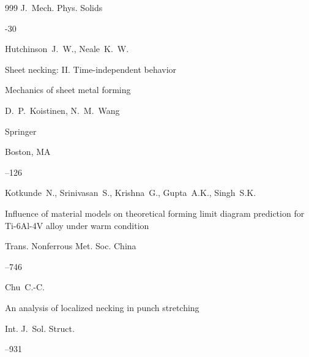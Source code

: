 \begin{thebibliography}{999}
\jour J.~Mech. Phys. Solids




-30





\by Hutchinson~J.~W., Neale~K.~W.

\paper Sheet necking: II. Time-independent behavior

\inbook Mechanics of sheet metal forming 

\eds D.~P.~Koistinen, N.~M.~Wang 

\publ Springer

\publaddr Boston, MA


–126





\by Kotkunde~N., Srinivasan~S., Krishna~G., Gupta~A.K., Singh~S.K.  

\paper Influence of material models on theoretical forming limit diagram prediction for Ti-6Al-4V alloy under warm condition

\jour Trans. Nonferrous Met. Soc. China



--746










\by Chu~C.-C. 

\paper An analysis of localized necking in punch stretching

\jour Int. J.~Sol. Struct.




--931






\end{thebibliography}
